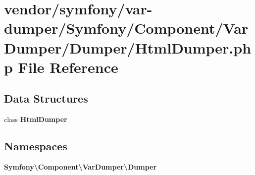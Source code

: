 \section{vendor/symfony/var-\/dumper/\+Symfony/\+Component/\+Var\+Dumper/\+Dumper/\+Html\+Dumper.php File Reference}
\label{symfony_2var-dumper_2_symfony_2_component_2_var_dumper_2_dumper_2_html_dumper_8php}
\subsection*{Data Structures}
\begin{DoxyCompactItemize}
\item 
class {\bf Html\+Dumper}
\end{DoxyCompactItemize}
\subsection*{Namespaces}
\begin{DoxyCompactItemize}
\item 
 {\bf Symfony\textbackslash{}\+Component\textbackslash{}\+Var\+Dumper\textbackslash{}\+Dumper}
\end{DoxyCompactItemize}
